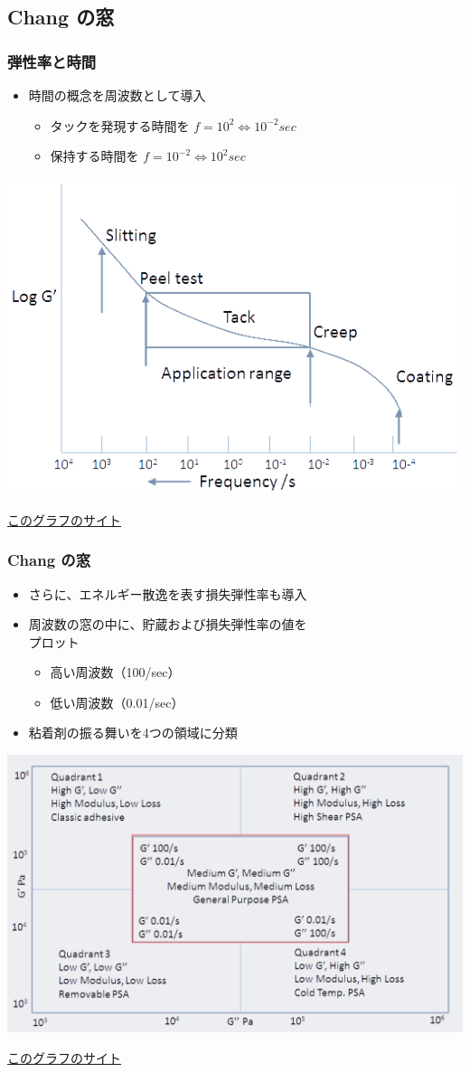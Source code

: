 \documentclass[12pt, dvipdfmx]{beamer}
\begin{document}
\subsection{Chang の窓}
\begin{frame}
	\frametitle{弾性率と時間}
		\begin{itemize}
			\item 時間の概念を周波数として導入
			\begin{itemize}
				\item タックを発現する時間を $f=10^2 \Leftrightarrow 10^{-2} sec$
				\item 保持する時間を $f=10^{-2} \Leftrightarrow 10^{2} sec$
			\end{itemize}
		\end{itemize}
		\centering
			\includegraphics[width=.6\textwidth]{ChangFrequencies_1.png}

		\href{https://www.stevenabbott.co.uk/practical-adhesion/chang.php}{このグラフのサイト}
\end{frame}

\begin{frame}
	\frametitle{Chang の窓}
		\begin{itemize}
			\item さらに、エネルギー散逸を表す損失弾性率も導入
			\item 周波数の窓の中に、貯蔵および損失弾性率の値を\\プロット
			\begin{itemize}
				\item 高い周波数（100/sec）
				\item 低い周波数（0.01/sec）
			\end{itemize}
			\item 粘着剤の振る舞いを4つの領域に分類
		\end{itemize}

		\vspace{3mm}
		\centering
			\includegraphics[width=.5\textwidth]{ChangFrequencies_2.png}

			\href{https://www.stevenabbott.co.uk/practical-adhesion/chang.php}{このグラフのサイト}
\end{frame}
\end{document}
